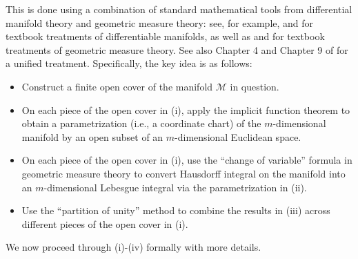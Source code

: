 \documentclass[12pt,american]{article}
\theoremstyle{definition}
\theoremstyle{plain}
\theoremstyle{definition}
\theoremstyle{plain}
\theoremstyle{plain}
\theoremstyle{plain}
\theoremstyle{plain}
\theoremstyle{plain}
\begin{document}
This is done using a combination of standard mathematical tools from
differential manifold theory and geometric measure theory: see, for
example, \citet{munkres1991analysis} and \citet*{lang2002introduction}
for textbook treatments of differentiable manifolds, as well as \citet*{federer1996geometric}
and \citet*{evans2015measure} for textbook treatments of geometric measure
theory. See also Chapter 4 and Chapter 9 of \cite{delfour2001shapes} for a unified treatment. Specifically, the key idea is as follows:
\begin{itemize}
\item[(i)] Construct a finite open cover of the manifold $\mathcal{M}$ in question.
\item[(ii)] On each piece of the open cover in (i), apply the implicit function
theorem to obtain a parametrization (i.e., a coordinate chart) of
the $m$-dimensional manifold by an open subset of an $m$-dimensional
Euclidean space.
\item[(iii)] On each piece of the open cover in (i), use the ``change of variable''
formula in geometric measure theory to convert Hausdorff integral
on the manifold into an $m$-dimensional Lebesgue integral via the
parametrization in (ii).
\item[(iv)] Use the ``partition of unity'' method to combine the results in
(iii) across different pieces of the open cover in (i).
\end{itemize}
We now proceed through (i)-(iv) formally with more details.
\end{document}

